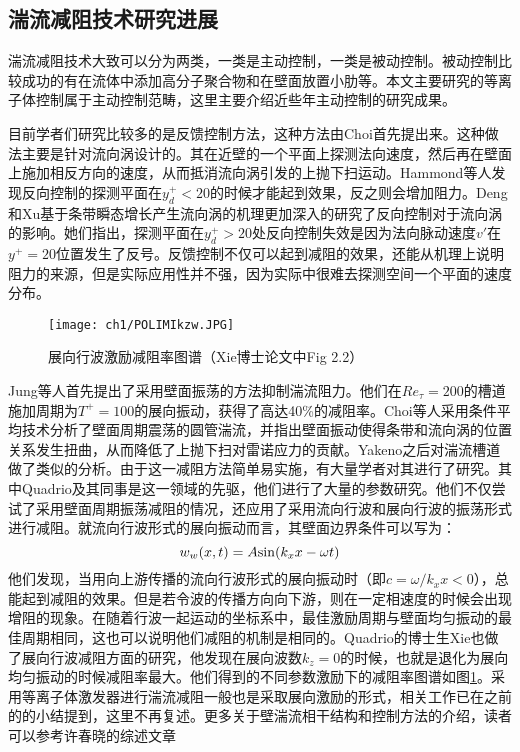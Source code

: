 \subsection{湍流减阻技术研究进展}
\label{chap1:sample:table}
湍流减阻技术大致可以分为两类，一类是主动控制，一类是被动控制。被动控制比较成功的有在流体中添加高分子聚合物\cite{White2008Mechanics}和在壁面放置小肋\cite{Garcia2011}等。本文主要研究的等离子体控制属于主动控制范畴，这里主要介绍近些年主动控制的研究成果。

目前学者们研究比较多的是反馈控制方法，这种方法由Choi\cite{Choi1994}首先提出来。这种做法主要是针对流向涡设计的。其在近壁的一个平面上探测法向速度，然后再在壁面上施加相反方向的速度，从而抵消流向涡引发的上抛下扫运动。Hammond等人\cite{Hammond1998}发现反向控制的探测平面在$y^+_d<20$的时候才能起到效果，反之则会增加阻力。Deng和Xu\cite{Deng2012}基于条带瞬态增长产生流向涡的机理更加深入的研究了反向控制对于流向涡的影响。她们指出，探测平面在$y^+_d>20$处反向控制失效是因为法向脉动速度$v'$在$y^+=20$位置发生了反号。反馈控制不仅可以起到减阻的效果，还能从机理上说明阻力的来源，但是实际应用性并不强，因为实际中很难去探测空间一个平面的速度分布。

\begin{figure}[htb]
  \centering
  \texttt{[image: ch1/POLIMIkzw.JPG]}
  \caption{展向行波激励减阻率图谱（Xie博士论文\cite{Xie2014}中Fig 2.2）}\label{f:POLIMIkzw}
\end{figure}
Jung等人\cite{Jung1992}首先提出了采用壁面振荡的方法抑制湍流阻力。他们在$Re_\tau=200$的槽道施加周期为$T^+=100$的展向振动，获得了高达40\%的减阻率。Choi等人\cite{Choi2002}采用条件平均技术分析了壁面周期震荡的圆管湍流，并指出壁面振动使得条带和流向涡的位置关系发生扭曲，从而降低了上抛下扫对雷诺应力的贡献。Yakeno\cite{Yakeno2014}之后对湍流槽道做了类似的分析。由于这一减阻方法简单易实施，有大量学者对其进行了研究。其中Quadrio及其同事是这一领域的先驱，他们进行了大量的参数研究\cite{Quadrio2009,Quadrio2011,Gatti2013,Gatti2016}。他们不仅尝试了采用壁面周期振荡减阻的情况，还应用了采用流向行波和展向行波的振荡形式进行减阻。就流向行波形式的展向振动而言，其壁面边界条件可以写为：
\begin{equation}
   w_w(x,t)=A{\rm sin}(k_xx-\omega t)
\end{equation}
他们发现，当用向上游传播的流向行波形式的展向振动时（即$c=\omega/k_xx<0$），总能起到减阻的效果。但是若令波的传播方向向下游，则在一定相速度的时候会出现增阻的现象。在随着行波一起运动的坐标系中，最佳激励周期与壁面均匀振动的最佳周期相同，这也可以说明他们减阻的机制是相同的。Quadrio的博士生Xie也做了展向行波减阻方面的研究\cite{Xie2014}，他发现在展向波数$k_z=0$的时候，也就是退化为展向均匀振动的时候减阻率最大。他们得到的不同参数激励下的减阻率图谱如图\ref{f:POLIMIkzw}。采用等离子体激发器进行湍流减阻一般也是采取展向激励的形式，相关工作已在之前的的小结提到，这里不再复述。更多关于壁湍流相干结构和控制方法的介绍，读者可以参考许春晓的综述文章\cite{Xu2015bi}



 
